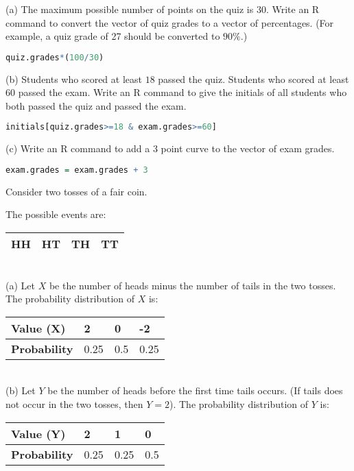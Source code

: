 \documentclass[boxes, qed]{homework}
\begin{document}
\begin{solution}
  (a) The maximum possible number of points on the quiz is $30$. Write an R command to convert
  the vector of quiz grades to a vector of percentages. 
  (For example, a quiz grade of 27 should be converted to $90\%$.)
  \begin{lstlisting}[backgroundcolor = \color{lightgray},language = R]
    quiz.grades*(100/30)
  \end{lstlisting}
  (b) Students who scored at least $18$ passed the quiz. 
  Students who scored at least $60$ passed the
  exam. Write an R command to give the initials of 
  all students who both passed the quiz and passed the
  exam.
  \begin{lstlisting}[backgroundcolor = \color{lightgray},language = R]
    initials[quiz.grades>=18 & exam.grades>=60]
  \end{lstlisting}
  (c) Write an R command to add a 3 point curve to the vector of exam grades.
  \begin{lstlisting}[backgroundcolor = \color{lightgray},language = R]
    exam.grades = exam.grades + 3
  \end{lstlisting}
\end{solution}
\begin{problem}Consider two tosses of a fair coin.
\end{problem}
\begin{solution}
  The possible events are:
  \begin{tabular}{|l|l|l|l|}
    \hline
    HH & HT & TH & TT \\
    \hline
  \end{tabular}\\

  (a) Let $X$ be the number of heads minus the number of tails in the two tosses.
  The probability distribution of $X$ is:\\

  \begin{tabular}{|l|l|l|l|}
    \hline
    \textbf{Value (X)} & 2 & 0 & -2 \\
    \hline
    \textbf{Probability} & 0.25 & 0.5 & 0.25 \\
    \hline
  \end{tabular}\\

  (b)  Let $Y$ be the number of heads before the 
  first time tails occurs. (If tails does not occur in the
  two tosses, then $Y = 2$).
  The probability distribution of $Y$ is:\\

  \begin{tabular}{|l|l|l|l|}
    \hline
    \textbf{Value (Y)} & 2 & 1 & 0 \\
    \hline
    \textbf{Probability} & 0.25 & 0.25 & 0.5 \\
    \hline
  \end{tabular}
\end{solution}
\end{document}

